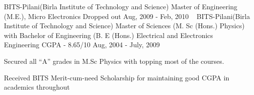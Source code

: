 

\begin{cventries}


  
    \cventry
    {BITS-Pilani(Birla Institute of Technology and Science)} %
    {Master of Engineering (M.E.), Micro Electronics} %
    {Dropped out} %
    {Aug, 2009 - Feb, 2010} %
    {~}
    \cventry
    {BITS-Pilani(Birla Institute of Technology and Science)} %
    {Master of Sciences (M. Sc (Hons.) Physics) with Bachelor of Engineering (B. E (Hons.) Electrical and Electronics Engineering} %
    {CGPA - 8.65/10} %
    {Aug, 2004 - July, 2009} %
    {
      \begin{cvitems} %
        \item {Secured all “A” grades in M.Sc Physics with topping most of the courses.}
	\item {Received BITS Merit-cum-need Scholarship for maintaining good CGPA in academics throughout}
      \end{cvitems}
    }

\end{cventries}
